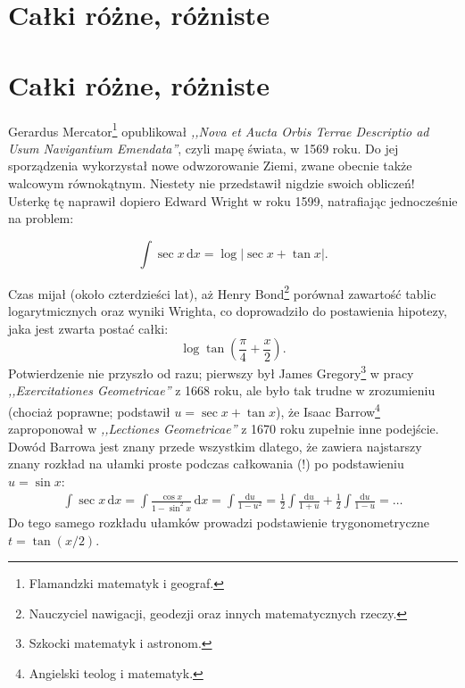 
\section{Całki różne, różniste}
\section{Całki różne, różniste}

Gerardus Mercator\footnote{Flamandzki matematyk i geograf.} opublikował \emph{,,Nova et Aucta Orbis Terrae Descriptio ad Usum Navigantium Emendata''}, czyli mapę świata, w 1569 roku.
Do jej sporządzenia wykorzystał nowe odwzorowanie Ziemi, zwane obecnie także walcowym równokątnym.
%
Niestety nie przedstawił nigdzie swoich obliczeń!
Usterkę tę naprawił dopiero Edward Wright w roku 1599, natrafiając jednocześnie na problem:

\begin{problem}
    \begin{equation}
        \int \sec x \,\mathrm{d} x = \log {| \sec x + \tan x|}.
    \end{equation}
\end{problem}

Czas mijał (około czterdzieści lat), aż Henry Bond\footnote{Nauczyciel nawigacji, geodezji oraz innych matematycznych rzeczy.} porównał zawartość tablic logarytmicznych oraz wyniki Wrighta, co doprowadziło do postawienia hipotezy, jaka jest zwarta postać całki:
\begin{equation}
    \log \tan \left(\frac \pi 4 + \frac x 2\right).
\end{equation}
%
Potwierdzenie nie przyszło od razu; pierwszy był James Gregory\footnote{Szkocki matematyk i astronom.} w pracy \emph{,,Exercitationes Geometricae''} z 1668 roku, ale było tak trudne w zrozumieniu (chociaż poprawne; podstawił $u = \sec x + \tan x$), że Isaac Barrow\footnote{Angielski teolog i matematyk.} zaproponował w \emph{,,Lectiones Geometricae''} z 1670 roku zupełnie inne podejście.
%
%
Dowód Barrowa jest znany przede wszystkim dlatego, że zawiera najstarszy znany rozkład na ułamki proste podczas całkowania (!) po podstawieniu $u = \sin x$:
%
\begin{align}
    \int \sec x \,\mathrm{d}x = \int \frac{\cos x}{1-\sin^2 x}\,\mathrm{d}x = \int \frac{\mathrm{d}u}{1-u^2} = \frac 1 2 \int \frac{\mathrm{d}u}{1 + u} + \frac 1 2 \int \frac{\mathrm{d}u}{1 - u} = \ldots
\end{align}
Do tego samego rozkładu ułamków prowadzi podstawienie trygonometryczne $t = \tan (x/2)$.

